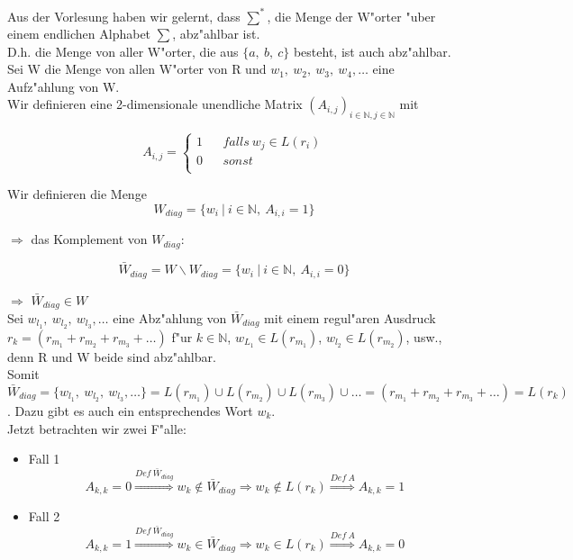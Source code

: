 \documentclass[a4paper,11pt]{scrartcl}
\begin{document}
	Aus der Vorlesung haben wir gelernt, dass $\sum ^{*}$, die Menge der W"orter "uber einem endlichen Alphabet $\sum$, abz"ahlbar ist.\\
	
	D.h. die Menge von aller W"orter, die aus $\{ a,\ b,\ c\}$ besteht, ist auch abz"ahlbar.\\
	
	
	Sei W die Menge von allen W"orter von R und $w_1,\ w_2,\ w_3,\ w_4,\dots$ eine Aufz"ahlung von W.\\
	
	Wir definieren eine 2-dimensionale unendliche Matrix $(A_{i,j})_{i\in \mathbb{N},j\in \mathbb{N}}$ mit
	
	
	$$ A_{i,j}=\left\{
	\begin{aligned}
		1 &  & falls\ w_j \in L(r_i)\\
		0 &  & sonst\\
	\end{aligned}
	\right.
	$$
	
	Wir definieren die Menge
	$$
	W_{diag} = \{ w_i\ |\ i\in \mathbb{N},\ A_{i,i} = 1 \} 
	$$
	
	$\Longrightarrow$ das Komplement von $W_{diag}$:
	
	$$
	\bar{W}_{diag} = W\backslash W_{diag} = \{ w_i\ |\ i\in \mathbb{N},\ A_{i,i} = 0 \} 
	$$
	
	$\Longrightarrow$ $\bar{W}_{diag} \in W$\\
	
	Sei $w_{l_1},\ w_{l_2},\ w_{l_3},\dots$ eine Abz"ahlung von $\bar{W}_{diag}$ mit einem regul"aren Ausdruck $r_k = (r_{m_1} + r_{m_2} + r_{m_3} + \dots )$ f"ur $k\in \mathbb{N}$, $w_{L_1}\in L(r_{m_1})$, $w_{l_2} \in L(r_{m_2})$, usw., denn R und W beide sind abz"ahlbar.\\ 
	
	Somit $\bar{W}_{diag} =\{ w_{l_1},\ w_{l_2},\ w_{l_3},\dots \} = L(r_{m_1}) \cup L(r_{m_2}) \cup L(r_{m_3}) \cup \dots = (r_{m_1} + r_{m_2} + r_{m_3} + \dots ) = L(r_k)$. Dazu gibt es auch ein entsprechendes Wort $w_k$.\\
	
	Jetzt betrachten wir zwei F"alle:
	
	\begin{itemize}
		\item Fall 1
		$$
		A_{k,k} = 0 \overset{Def\ \bar{W}_{diag}}{\Longrightarrow} w_k \notin \bar{W}_{diag} \Longrightarrow w_k \notin L(r_k)	 \overset{Def\ A}{\Longrightarrow} A_{k,k} = 1
		$$
		
		\item Fall 2
		$$
		A_{k,k} = 1 \overset{Def\ \bar{W}_{diag}}{\Longrightarrow} w_k \in \bar{W}_{diag} \Longrightarrow w_k \in L(r_k) \overset{Def\ A}{\Longrightarrow} A_{k,k} = 0
		$$		
	\end{itemize}
	
\end{document}
